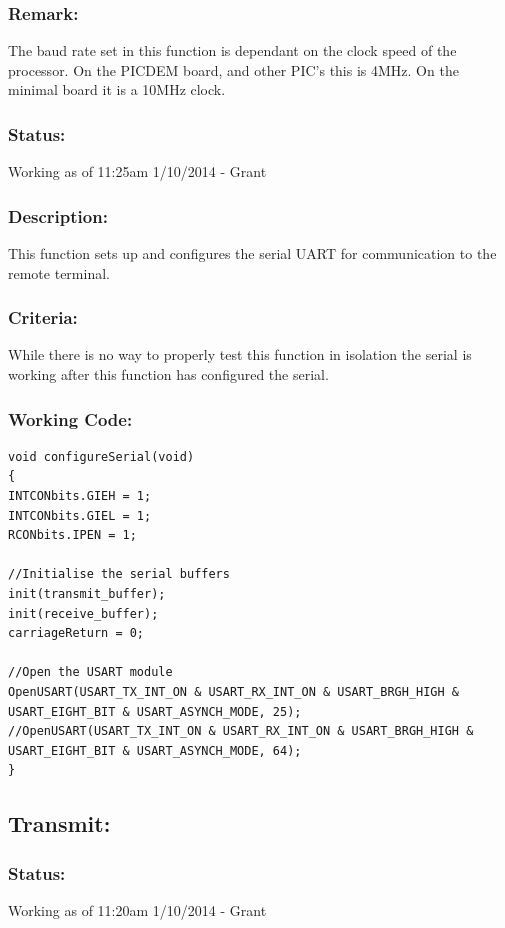 \documentclass[]{report}
\begin{document}
\subsubsection{Remark:}
The baud rate set in this function is dependant on the clock speed of the processor. On the PICDEM board, and other PIC's this is 4MHz. On the minimal board it is a 10MHz clock.

\subsubsection{Status:}
Working as of 11:25am 1/10/2014 - Grant

\subsubsection{Description:}
This function sets up and configures the serial UART for communication to the remote terminal.

\subsubsection{Criteria:}
While there is no way to properly test this function in isolation the serial is working after this function has configured the serial.

\subsubsection{Working Code:}
\begin{lstlisting}
void configureSerial(void)
{
INTCONbits.GIEH = 1;
INTCONbits.GIEL = 1;
RCONbits.IPEN = 1;

//Initialise the serial buffers
init(transmit_buffer);
init(receive_buffer);
carriageReturn = 0;

//Open the USART module
OpenUSART(USART_TX_INT_ON & USART_RX_INT_ON & USART_BRGH_HIGH & USART_EIGHT_BIT & USART_ASYNCH_MODE, 25);
//OpenUSART(USART_TX_INT_ON & USART_RX_INT_ON & USART_BRGH_HIGH & USART_EIGHT_BIT & USART_ASYNCH_MODE, 64);
}
\end{lstlisting}

\subsection{Transmit:}
\subsubsection{Status:}
Working as of 11:20am 1/10/2014 - Grant
\end{document}
